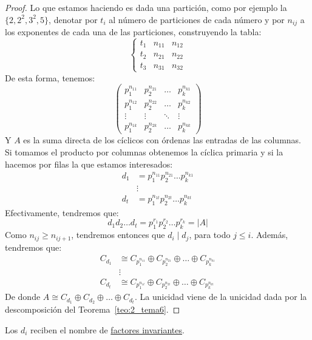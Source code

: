 \begin{teo}
\begin{proof}
        Lo que estamos haciendo es dada una partición, como por ejemplo la $\{2, 2^2, 3^2, 5\}$, denotar por $t_i$ al número de particiones de cada número y por $n_{ij}$ a los exponentes de cada una de las particiones, construyendo la tabla:
        \begin{equation*}
            \left\{\begin{array}{c|cc}
                    t_1 & n_{11} & n_{12} \\
                    t_2 & n_{21} & n_{22} \\
                    t_3 & n_{31} & n_{32} 
            \end{array}\right.
        \end{equation*}
        De esta forma, tenemos:
        \begin{equation*}
            \left(\begin{array}{cccc}
                p_1^{n_{11}} & p_2^{n_{21}} & \ldots & p_k^{n_{k1}} \\
                p_1^{n_{12}} & p_2^{n_{22}} & \ldots  & p_k^{n_{k2}}  \\
                 \vdots & \vdots & \ddots & \vdots \\
                 p_1^{n_{1k}} & p_2^{n_{2k}} & \ldots & p_k^{n_{kk}}  
            \end{array}\right)
        \end{equation*}
        Y $A$ es la suma directa de los cíclicos con órdenas las entradas de las columnas. 
        Si tomamos el producto por columnas obtenemos la cíclica primaria y si la hacemos por filas la que estamos interesados:
        \begin{align*}
            d_1 &= p_1^{n_{11}}p_2^{n_{21}} \ldots p_k^{n_{k1}} \\
                &\vdots \\
            d_t &= p_1^{n_{1t}}p_2^{n_{2t}} \ldots p_k^{n_{kt}} 
        \end{align*}
        Efectivamente, tendremos que:
        \begin{equation*}
            d_1d_2 \ldots d_t = p_1^{r_1} p_2^{r_2} \ldots p_k^{r_k} = |A|
        \end{equation*}
        Como $n_{ij}\geq n_{ij+1}$, tendremos entonces que $d_i \mid d_j$, para todo $j\leq i$. Además, tendremos que:
        \begin{align*}
            C_{d_1} &\cong C_{p_1^{n_{11}}} \oplus C_{p_2^{n_{21}}} \oplus \ldots \oplus C_{p_k^{n_{k1}}} \\
                    &\vdots \\
            C_{d_t} &\cong C_{p_1^{n_{1t}}} \oplus C_{p_2^{n_{2t}}} \oplus \ldots \oplus C_{p_k^{n_{kt}}} 
        \end{align*}
        De donde $A \cong C_{d_1}\oplus C_{d_2}\oplus \ldots \oplus C_{d_t}$. La unicidad viene de la unicidad dada por la descomposición del Teorema~\ref{teo:2_tema6}.
    \end{proof} 
    Los $d_i$ reciben el nombre de \underline{factores invariantes}.
\end{teo}

